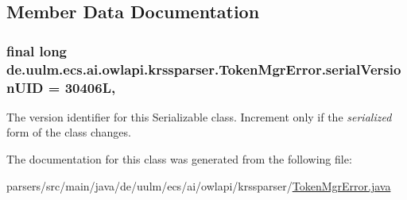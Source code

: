 \subsection{Member Data Documentation}
\hypertarget{classde_1_1uulm_1_1ecs_1_1ai_1_1owlapi_1_1krssparser_1_1_token_mgr_error_a28b1f17069dda4e21f95314be4a0d971}{
\subsubsection[{serial\-Version\-U\-I\-D}]{\setlength{\rightskip}{0pt plus 5cm}final long de.\-uulm.\-ecs.\-ai.\-owlapi.\-krssparser.\-Token\-Mgr\-Error.\-serial\-Version\-U\-I\-D = 30406\-L\hspace{0.3cm}{\ttfamily [static]}, {\ttfamily [private]}}}\label{classde_1_1uulm_1_1ecs_1_1ai_1_1owlapi_1_1krssparser_1_1_token_mgr_error_a28b1f17069dda4e21f95314be4a0d971}
The version identifier for this Serializable class. Increment only if the {\itshape serialized} form of the class changes. 

The documentation for this class was generated from the following file\-:\begin{DoxyCompactItemize}
\item 
parsers/src/main/java/de/uulm/ecs/ai/owlapi/krssparser/\hyperlink{de_2uulm_2ecs_2ai_2owlapi_2krssparser_2_token_mgr_error_8java}{Token\-Mgr\-Error.\-java}\end{DoxyCompactItemize}
